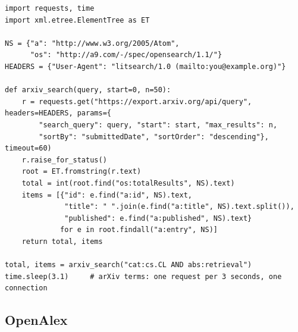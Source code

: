 \documentclass[11pt,a4paper]{article}
\begin{document}
\begin{lstlisting}[caption={arXiv: запрос с паузой 3 секунды}]
import requests, time
import xml.etree.ElementTree as ET

NS = {"a": "http://www.w3.org/2005/Atom",
      "os": "http://a9.com/-/spec/opensearch/1.1/"}
HEADERS = {"User-Agent": "litsearch/1.0 (mailto:you@example.org)"}

def arxiv_search(query, start=0, n=50):
    r = requests.get("https://export.arxiv.org/api/query", headers=HEADERS, params={
        "search_query": query, "start": start, "max_results": n,
        "sortBy": "submittedDate", "sortOrder": "descending"}, timeout=60)
    r.raise_for_status()
    root = ET.fromstring(r.text)
    total = int(root.find("os:totalResults", NS).text)
    items = [{"id": e.find("a:id", NS).text,
              "title": " ".join(e.find("a:title", NS).text.split()),
              "published": e.find("a:published", NS).text}
             for e in root.findall("a:entry", NS)]
    return total, items

total, items = arxiv_search("cat:cs.CL AND abs:retrieval")
time.sleep(3.1)     # arXiv terms: one request per 3 seconds, one connection
\end{lstlisting}

\subsection{OpenAlex}
\end{document}
